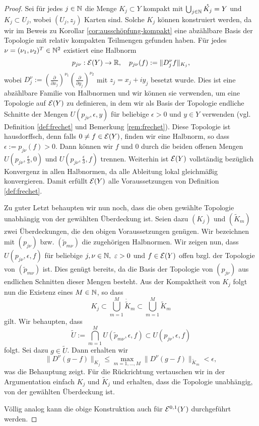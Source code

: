\begin{proof}
  Sei für jedes $j \in \mathbb{N}$ die Menge $K_j \subset Y$ kompakt mit $\bigcup_{j \in \mathbb{N}}
  \mathring{K_j} = Y$ und $K_j \subset U_j$, wobei $(U_j, z_j)$ Karten
  sind. Solche $K_j$ können konstruiert werden, da wir im Beweis zu
  Korollar \ref{cor:ausschöpfung-kompakt} eine abzählbare Basis der
  Topologie mit relativ kompakten Teilmengen gefunden haben.
  Für jedes $\nu = (\nu_1, \nu_2)^T \in \mathbb{N}^2$ existiert eine Halbnorm
  \[
  p_{j\nu}: \mathcal{E}(Y) \rightarrow \mathbb{R}, \quad p_{j\nu}(f) := \|D_j^\nu f\|_{K_j},
  \]
  wobei $D^\nu_j := \left ( \frac{\partial}{\partial x_j} \right
  )^{\nu_1} \left ( \frac{\partial}{\partial y_j} \right )^{\nu_2}$
  mit $z_j = x_j + iy_j$ besetzt wurde. Dies ist eine abzählbare Familie von
  Halbnormen und wir können sie verwenden, um eine Topologie auf
  $\mathcal{E}(Y)$ zu definieren, in dem wir als Basis der Topologie
  endliche Schnitte der Mengen $U(p_{j\nu}, \epsilon, y)$ für
  beliebige $\epsilon > 0$ und $y \in Y$ verwenden (vgl. Definition
  \ref{def:frechet} und Bemerkung \ref{rem:frechet}). Diese Topologie
  ist hausdorffsch, denn falls $0 \neq f \in \mathcal{E}(Y)$, finden wir
  eine Halbnorm, so dass $\epsilon := p_{j\nu}(f) > 0$. Dann können wir $f$ und 0
  durch die beiden offenen Mengen $U(p_{j\nu}, \frac{\epsilon}{3}, 0)$
  und $U(p_{j\nu}, \frac{\epsilon}{3}, f)$ trennen. Weiterhin ist
  $\mathcal{E}(Y)$ vollständig bezüglich Konvergenz in allen Halbnormen, da
  alle Ableitung lokal gleichmäßig konvergieren. Damit erfüllt
  $\mathcal{E}(Y)$ alle Voraussetzungen von Definition \ref{def:frechet}.
  
  Zu guter Letzt behaupten wir nun noch, dass die oben gewählte
  Topologie unabhängig von der gewählten Überdeckung ist. Seien dazu
  $(K_j)$ und $(\tilde K_m)$ zwei Überdeckungen, die den obigen
  Voraussetzungen genügen. Wir bezeichnen mit $(p_{j\nu})$
  bzw. $(\tilde p_{m\nu})$ die zugehörigen Halbnormen. Wir zeigen nun,
  dass $U(p_{j\nu}, \epsilon, f)$ für beliebige $j, \nu \in\mathbb{N},\
  \varepsilon > 0$ und $f \in \mathcal{E}(Y)$ offen bzgl. der Topologie von
  $(\tilde p_{m\nu})$ ist. Dies genügt bereits, da die Basis der
  Topologie von $(p_{j\nu})$ aus endlichen Schnitten dieser Mengen
  besteht. Aus der Kompaktheit von $K_j$ folgt nun die Existenz eines
  $M \in \mathbb{N}$, so dass
  \[
  K_j \subset \bigcup_{m=1}^M \mathring{\tilde K}_m \subset \bigcup_{m=1}^M \tilde K_m
  \]
  gilt. Wir behaupten, dass
  \[
  \tilde U := \bigcap_{m=1}^M U(\tilde p_{m\nu}, \epsilon, f) \subset
  U(p_{j\nu}, \epsilon, f)
  \]
  folgt. Sei dazu $g \in \tilde U$. Dann erhalten wir
  \[
  \|D^\nu(g-f)\|_{K_j} \leq \max_{m=1, \dots, M} \|D^\nu(g-f)\|_{\tilde
    K_m} < \epsilon,
  \]
  was die Behauptung zeigt. Für die Rückrichtung vertauschen wir in
  der Argumentation einfach $K_j$ und $\tilde K_j$ und erhalten, dass
  die Topologie unabhängig, von der gewählten Überdeckung ist.
  
  Völlig analog kann die obige Konstruktion auch für $\mathcal{E}^{0,1}(Y)$
  durchgeführt werden.
\end{proof}

